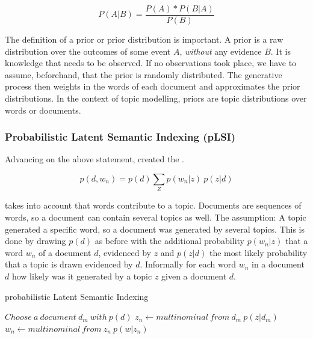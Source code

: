           \begin{equation}
            P(A|B) = \frac{P(A) * P(B|A)}{P(B)}
          \end{equation}
        
        The definition of a prior or prior distribution is important. A prior is a raw distribution over the outcomes of some event $A$, \emph{without} any evidence $B$. It is knowledge that needs to be observed. If no observations took place, we have to assume, beforehand, that the prior is randomly distributed. The generative process then weights in the words of each document and approximates the prior distributions. In the context of topic modelling, priors are topic distributions over words or documents.\\ 
        
      \subsubsection*{Probabilistic Latent Semantic Indexing (pLSI)}
      Advancing on the above statement, \cite{PLSA2001} created the \plsifull{}.

        \begin{equation}
          p(d, w_n) = p(d)\sum_{Z} p(w_n|z)\:p(z|d)
        \end{equation} 

      \plsi{} takes into account that words contribute to a topic. Documents are sequences of words, so a document can contain several topics as well. The assumption: A topic generated a specific word, so a document was generated by several topics. This is done by drawing $p(d)$ as before with the additional probability $p(w_n|z)$ that a word $w_n$ of a document $d$, evidenced by $z$ and $p(z|d)$ the most likely probability that a topic is drawn evidenced by $d$. Informally for each word $w_n$ in a document $d$ how likely was it generated by a topic $z$ given a document $d$.

      \begin{algorithm}[H]
      \begin{algorithmic}[1]
        \caption{probabilistic Latent Semantic Indexing}\label{PLSI}
        \State $Choose\:a\:document\:d_m\:with\:p(d)$
            \State $z_n \gets multinominal\:from\:d_m\:p(z|d_m)$
            \State $w_n \gets multinominal\:from\:z_n\:p(w|z_n)$
          \EndFor
      \end{algorithmic}
      \end{algorithm}


